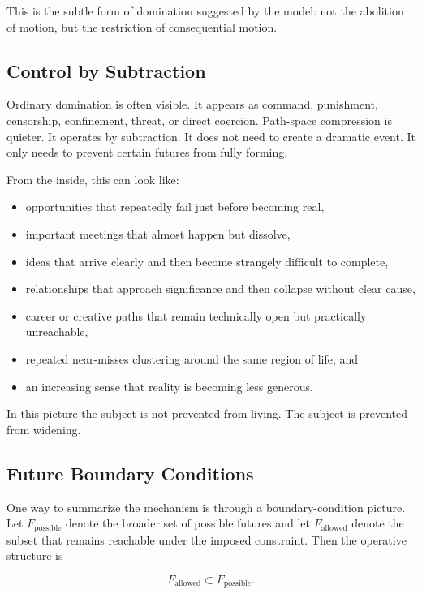 \documentclass[12pt]{article}
\begin{document}
This is the subtle form of domination suggested by the model: not the abolition of motion, but the restriction of consequential motion.

\subsection{Control by Subtraction}

Ordinary domination is often visible. It appears as command, punishment, censorship, confinement, threat, or direct coercion. Path-space compression is quieter. It operates by subtraction. It does not need to create a dramatic event. It only needs to prevent certain futures from fully forming.

From the inside, this can look like:

\begin{itemize}
    \item opportunities that repeatedly fail just before becoming real,
    \item important meetings that almost happen but dissolve,
    \item ideas that arrive clearly and then become strangely difficult to complete,
    \item relationships that approach significance and then collapse without clear cause,
    \item career or creative paths that remain technically open but practically unreachable,
    \item repeated near-misses clustering around the same region of life, and
    \item an increasing sense that reality is becoming less generous.
\end{itemize}

In this picture the subject is not prevented from living. The subject is prevented from widening.

\subsection{Future Boundary Conditions}

One way to summarize the mechanism is through a boundary-condition picture. Let $F_{\mathrm{possible}}$ denote the broader set of possible futures and let $F_{\mathrm{allowed}}$ denote the subset that remains reachable under the imposed constraint. Then the operative structure is

\[
F_{\mathrm{allowed}} \subset F_{\mathrm{possible}}.
\]
\end{document}
